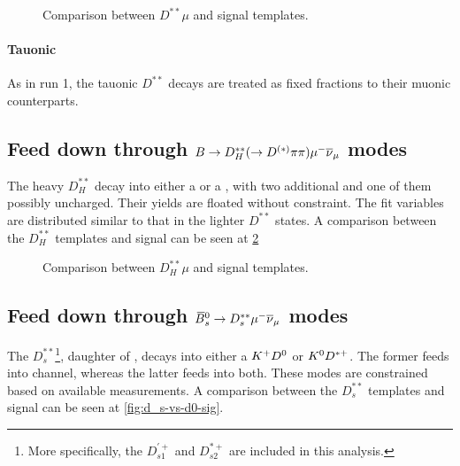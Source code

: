 \begin{figure}[htb]

    \caption{Comparison between $D^{**}\mu$ and \Dz\taum signal templates.}
    \label{fig:dstst-mu-vs-d0-sig}
\end{figure}

\paragraph{Tauonic}
As in run 1, the tauonic $D^{**}$ decays are treated as fixed fractions
to their muonic counterparts.


\subsection{Feed down through $B \rightarrow D_H^{**}(\rightarrow D^{(*)}\pi\pi){\mu^-}{{\overline{\nu}}_\mu}$ modes}

The heavy $D_H^{**}$ decay into either a \Dz or a \Dstar, with two additional
\pion and one of them possibly uncharged.
Their yields are floated without constraint.
The fit variables are distributed similar to that in the lighter
$D^{**}$ states.
A comparison between the $D_H^{**}$ templates and \Dz\taum signal can be
seen at \ref{fig:dstst-heavy-vs-d0-sig}

\begin{figure}[htb]

    \caption{Comparison between $D_H^{**}\mu$ and \Dz\taum signal templates.}
    \label{fig:dstst-heavy-vs-d0-sig}
\end{figure}


\subsection{Feed down through ${{\kern 0.18em\overline{\kern -0.18em B}}{}^0_{s}} \rightarrow D_s^{**}{\mu^-}{{\overline{\nu}}_\mu}$ modes}

The $D_s^{**}$\footnote{
    More specifically, the $D_{s1}^{'+}$ and $D_{s2}^{*+}$ are included in
    this analysis.
}, daughter of \Bsb, decays into either a ${{K}^+}{{D}^0}$ or ${{K}^0}{{D}^{*+}}$.
The former feeds into \Dz channel, whereas the latter feeds into both.
These modes are constrained based on available measurements.
A comparison between the $D_s^{**}$ templates and \Dz\taum signal can be
seen at \cref{fig:d_s-vs-d0-sig}.

